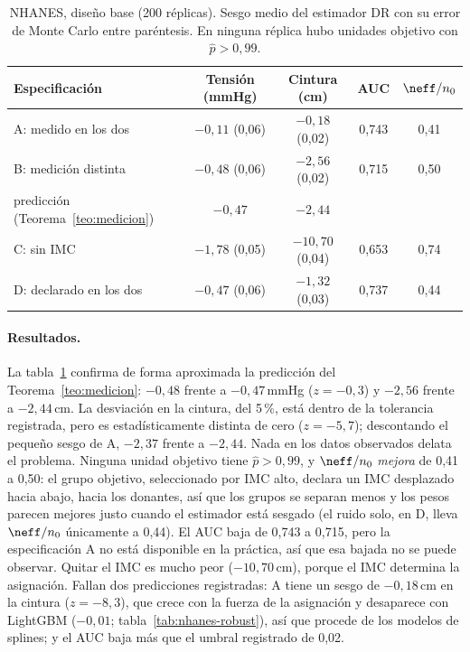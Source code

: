 \begin{table}[ht]
\centering
\caption{NHANES, diseño base (200 réplicas). Sesgo medio del estimador DR con su error de Monte Carlo entre paréntesis. En ninguna réplica hubo unidades objetivo con $\hat p>0,99$.}\label{tab:nhanes}
\begin{tabular}{@{}lcccc@{}}
\toprule
Especificación & Tensión (mmHg) & Cintura (cm) & AUC & $\neff/n_0$ \\
\midrule
A: medido en los dos & $-0,11$ (0,06) & $-0,18$ (0,02) & 0,743 & 0,41 \\
B: medición distinta & $-0,48$ (0,06) & $-2,56$ (0,02) & 0,715 & 0,50 \\
\quad predicción (Teorema~\ref{teo:medicion}) & $-0,47$ & $-2,44$ & & \\
C: sin IMC & $-1,78$ (0,05) & $-10,70$ (0,04) & 0,653 & 0,74 \\
D: declarado en los dos & $-0,47$ (0,06) & $-1,32$ (0,03) & 0,737 & 0,44 \\
\bottomrule
\end{tabular}
\end{table}

\paragraph{Resultados.} La tabla~\ref{tab:nhanes} confirma de forma aproximada la predicción del Teorema~\ref{teo:medicion}: $-0,48$ frente a $-0,47$\,mmHg ($z=-0,3$) y $-2,56$ frente a $-2,44$\,cm. La desviación en la cintura, del 5\,\%, está dentro de la tolerancia registrada, pero es estadísticamente distinta de cero ($z=-5,7$); descontando el pequeño sesgo de A, $-2,37$ frente a $-2,44$. Nada en los datos observados delata el problema. Ninguna unidad objetivo tiene $\hat p>0,99$, y $\neff/n_0$ \emph{mejora} de 0,41 a 0,50: el grupo objetivo, seleccionado por IMC alto, declara un IMC desplazado hacia abajo, hacia los donantes, así que los grupos se separan menos y los pesos parecen mejores justo cuando el estimador está sesgado (el ruido solo, en D, lleva $\neff/n_0$ únicamente a 0,44). El AUC baja de 0,743 a 0,715, pero la especificación A no está disponible en la práctica, así que esa bajada no se puede observar. Quitar el IMC es mucho peor ($-10,70$\,cm), porque el IMC determina la asignación. Fallan dos predicciones registradas: A tiene un sesgo de $-0,18$\,cm en la cintura ($z=-8,3$), que crece con la fuerza de la asignación y desaparece con LightGBM ($-0,01$; tabla~\ref{tab:nhanes-robust}), así que procede de los modelos de splines; y el AUC baja más que el umbral registrado de 0,02.

